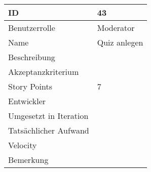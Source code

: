 \begin{tabularx}{\textwidth}{|p{}|X|}
	\hline
	ID & 43\\
	\hline
	Benutzerrolle & Moderator\\
	\hline
	Name & Quiz anlegen\\
	\hline
	Beschreibung & \\
	\hline
	Akzeptanzkriterium & \\
	\hline
	Story Points & 7\\
	\hline
	Entwickler & \\
	\hline
	Umgesetzt in Iteration & \\ 
	\hline
	Tatsächlicher Aufwand & \\
	\hline
	Velocity & \\
	\hline
	Bemerkung & \\
	\hline
\end{tabularx}
\vspace{20pt}
